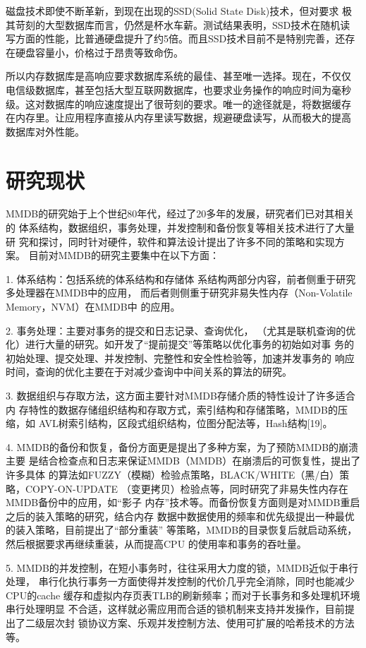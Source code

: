 \documentclass[literaturereview]{zjutreport}
\begin{document}
磁盘技术即使不断革新，到现在出现的SSD(Solid State Disk)技术，但对要求
极其苛刻的大型数据库而言，仍然是杯水车薪。测试结果表明，SSD技术在随机读
写方面的性能，比普通硬盘提升了约5倍。而且SSD技术目前不是特别完善，还存
在硬盘容量小，价格过于昂贵等致命伤。

所以内存数据库是高响应要求数据库系统的最佳、甚至唯一选择。现在，不仅仅
电信级数据库，甚至包括大型互联网数据库，也要求业务操作的响应时间为毫秒
级。这对数据库的响应速度提出了很苛刻的要求。唯一的途径就是，将数据缓存
在内存里。让应用程序直接从内存里读写数据，规避硬盘读写，从而极大的提高
数据库对外性能。

\chapter{研究现状}
MMDB的研究始于上个世纪80年代，经过了20多年的发展，研究者们已对其相关的
体系结构，数据组织，事务处理，并发控制和备份恢复等相关技术进行了大量研
究和探讨，同时针对硬件，软件和算法设计提出了许多不同的策略和实现方案。
目前对MMDB的研究主要集中在以下方面：

1. 体系结构：包括系统的体系结构和存储体
系结构两部分内容，前者侧重于研究多处理器在MMDB中的应用，
而后者则侧重于研究非易失性内存（Non-Volatile Memory，NVM）在MMDB中
的应用。

2. 事务处理：主要对事务的提交和日志记录、查询优化，
（尤其是联机查询的优化）进行大量的研究。如开发了“提前提交”等策略以优化事务的初始如对事
务的初始处理、提交处理、并发控制、完整性和安全性检验等，加速并发事务的
响应时间，查询的优化主要在于对减少查询中中间关系的算法的研究。

3. 数据组织与存取方法，这方面主要针对MMDB存储介质的特性设计了许多适合内
存特性的数据存储组织结构和存取方式，索引结构和存储策略，MMDB的压缩，如
AVL树索引结构，区段式组织结构，位图分配法等，Hash结构[19]。

4. MMDB的备份和恢复，备份方面更是提出了多种方案，为了预防MMDB的崩溃主要
是结合检查点和日志来保证MMDB（MMDB）在崩溃后的可恢复性，提出了许多具体
的算法如FUZZY（模糊）检验点策略，BLACK/WHITE（黑/白）策略，COPY-ON-UPDATE
（变更拷贝）检验点等，同时研究了非易失性内存在MMDB备份中的应用，如“影子
内存”技术等。而备份恢复方面则是对MMDB重启之后的装入策略的研究，结合内存
数据中数据使用的频率和优先级提出一种最优的装入策略，目前提出了“部分重装”
等策略，MMDB的目录恢复后就启动系统，然后根据要求再继续重装，从而提高CPU
的使用率和事务的吞吐量。

5. MMDB的并发控制，在短小事务时，往往采用大力度的锁，MMDB近似于串行处理，
串行化执行事务一方面使得并发控制的代价几乎完全消除，同时也能减少CPU的cache
缓存和虚拟内存页表TLB的刷新频率；而对于长事务和多处理机环境串行处理明显
不合适，这样就必需应用而合适的锁机制来支持并发操作，目前提出了二级层次封
锁协议方案、乐观并发控制方法、使用可扩展的哈希技术的方法等。
\end{document}
